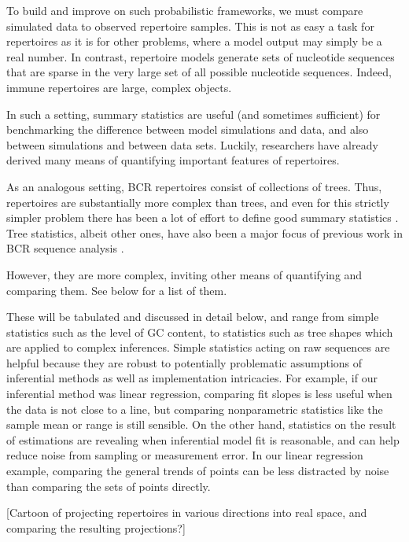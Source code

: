 \documentclass{article}
\begin{document}
To build and improve on such probabilistic frameworks, we must compare simulated data to observed repertoire samples.
This is not as easy a task for repertoires as it is for other problems, where a model output may simply be a real number.
In contrast, repertoire models generate sets of nucleotide sequences that are sparse in the very large set of all possible nucleotide sequences.
Indeed, immune repertoires are large, complex objects.

In such a setting, summary statistics are useful (and sometimes sufficient) for benchmarking the difference between model simulations and data, and also between simulations and between data sets.
Luckily, researchers have already derived many means of quantifying important features of repertoires.

As an analogous setting, BCR repertoires consist of collections of trees.
Thus, repertoires are substantially more complex than trees, and even for this strictly simpler problem there has been a lot of effort to define good summary statistics \cite{Mooers1997-jl}.
Tree statistics, albeit other ones, have also been a major focus of previous work in BCR sequence analysis \cite{Dunn-Walters2004-hv,Mehr2004-ej,Steiman-Shimony2006-fm,Shahaf2008-cc}.

However, they are more complex, inviting other means of quantifying and comparing them.
See below for a list of them.



These will be tabulated and discussed in detail below, and range from simple statistics such as the level of GC content, to statistics such as tree shapes which are applied to complex inferences.
Simple statistics acting on raw sequences are helpful because they are robust to potentially problematic assumptions of inferential methods as well as implementation intricacies.
For example, if our inferential method was linear regression, comparing fit slopes is less useful when the data is not close to a line, but comparing nonparametric statistics like the sample mean or range is still sensible.
On the other hand, statistics on the result of estimations are revealing when inferential model fit is reasonable, and can help reduce noise from sampling or measurement error.
In our linear regression example, comparing the general trends of points can be less distracted by noise than comparing the sets of points directly.

[Cartoon of projecting repertoires in various directions into real space, and comparing the resulting projections?]
\end{document}
